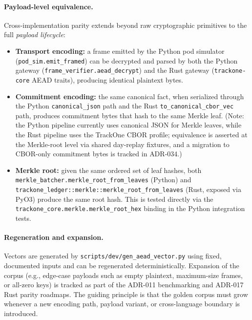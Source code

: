 \paragraph{Payload-level equivalence.}
Cross-implementation parity extends beyond raw cryptographic primitives to the full
\emph{payload lifecycle}:
\begin{itemize}[nosep]
    \item \textbf{Transport encoding:} a frame emitted by the Python pod simulator
    (\texttt{pod\_sim.emit\_framed}) can be decrypted and parsed by both the Python
    gateway (\texttt{frame\_verifier.aead\_decrypt}) and the Rust gateway
    (\texttt{trackone-core} \ac{AEAD} traits), producing identical plaintext bytes.
    \item \textbf{Commitment encoding:} the same canonical fact, when serialized through
    the Python \texttt{canonical\_json} path and the Rust \texttt{to\_canonical\_cbor\_vec}
    path, produces commitment bytes that hash to the same Merkle leaf.
    (Note: the Python pipeline currently uses canonical \ac{JSON} for Merkle leaves,
    while the Rust pipeline uses the TrackOne \ac{CBOR} profile; equivalence is asserted
    at the Merkle-root level via shared day-replay fixtures, and a migration to
    \ac{CBOR}-only commitment bytes is tracked in \ac{ADR}-034.)
    \item \textbf{Merkle root:} given the same ordered set of leaf hashes, both
    \texttt{merkle\_batcher.merkle\_root\_from\_leaves} (Python) and
    \texttt{trackone\_ledger::merkle::merkle\_root\_from\_leaves} (Rust, exposed via PyO3)
    produce the same root hash.
    This is tested directly via the \texttt{trackone\_core.merkle.merkle\_root\_hex}
    binding in the Python integration tests.
\end{itemize}

\paragraph{Regeneration and expansion.}
Vectors are generated by \texttt{scripts/dev/gen\_aead\_vector.py} using fixed,
documented inputs and can be regenerated deterministically.
Expansion of the corpus (e.g., edge-case payloads such as empty plaintext, maximum-size frames,
or all-zero keys) is tracked as part of the \ac{ADR}-011 benchmarking and \ac{ADR}-017 Rust parity roadmaps.
The guiding principle is that the golden corpus must grow whenever a new encoding path, payload
variant, or cross-language boundary is introduced.

